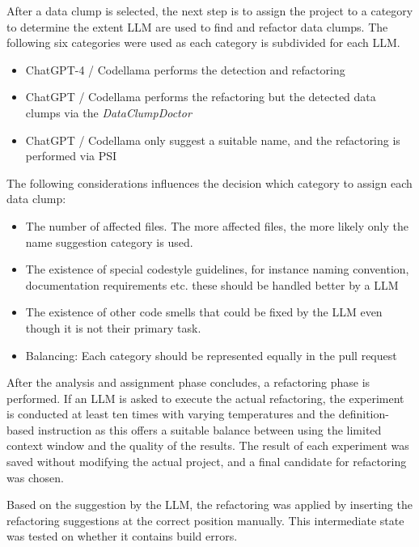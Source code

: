After a data clump is selected, the next step is to assign the project to a category to determine the extent \acs{LLM} are used to find and refactor data clumps.  The following six categories were used as each category is subdivided for each LLM. 

\begin{itemize}
    \item ChatGPT-4 / Codellama performs the detection and refactoring
    \item ChatGPT / Codellama performs the refactoring but the detected data clumps via the \textit{DataClumpDoctor}
    \item ChatGPT / Codellama only suggest a suitable name, and the refactoring is performed via \ac{PSI}
\end{itemize}

The following considerations influences the decision which category to assign each data clump:
\begin{itemize}
   \item	The number of affected files. The more affected files, the more likely only the name suggestion category is used. 
\item	The existence of special codestyle guidelines, for instance naming convention, documentation requirements etc. these should be handled better by a LLM
\item	The existence of other code smells that could be fixed by the LLM even though it is not their primary task.
\item Balancing: Each category should be represented equally in the pull request
\end{itemize}

After the analysis and assignment phase concludes, a refactoring phase is performed. If an \ac{LLM} is asked to execute the actual refactoring, the experiment is conducted at least ten times with varying temperatures and the definition-based instruction as this offers a suitable balance between using the limited context window and the quality of the results. The result of each experiment was saved without modifying the actual project, and a final candidate for refactoring was chosen. 

Based on the suggestion by the LLM, the refactoring was applied by inserting the refactoring suggestions at the correct position manually. This intermediate state was tested on whether it contains build errors.  